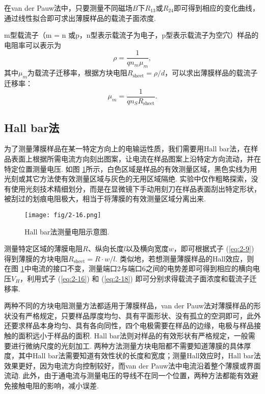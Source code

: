 \documentclass[12pt,a4paper,openany,twoside,UTF-8]{book}
\begin{document}
在van der Pauw法中，只要测量不同磁场$B$下$R_{13}$或$R_{24}$即可得到相应的变化曲线，通过线性拟合即可求出薄膜样品的载流子面浓度.

m型载流子（m = n 或p，n型表示载流子为电子，p型表示载流子为空穴）样品的电阻率可以表示为
\begin{equation}
\rho = \frac{1}{qn_m\mu_m},
\label{eq:2-17}
\end{equation}
其中$\mu_m$为载流子迁移率，根据方块电阻$R_{\mathrm{sheet}} = \rho/d$，可以求出薄膜样品的载流子迁移率：
\begin{equation}
\mu_m = \frac{1}{qn_SR_{\mathrm{sheet}}}.
\label{eq:2-18}
\end{equation}

\subsection{Hall bar法}
为了测量薄膜样品在某一特定方向上的电输运性质，我们需要用Hall bar法，在样品表面上根据所需电流方向刻出图案，让电流在样品图案上沿特定方向流动，并在特定位置测量电压. 如图 \ref{fig:2-16}所示，白色区域是样品的有效测量区域，黑色实线为用光刻或其它方法使有效测量区域与灰色的无用区域隔绝. 实验中仅作粗略探索，没有使用光刻技术精细划分，而是在显微镜下手动用刻刀在样品表面刮出特定形状，被刮过的划痕电阻极大，相当于将薄膜的有效测量区域分离出来.

\begin{figure}[htbp]
\centering
\texttt{[image: fig/2-16.png]}
\caption{Hall bar法测量电阻示意图.}
\label{fig:2-16} 
\end{figure}

测量特定区域的薄膜电阻$R$、纵向长度$l$以及横向宽度$w$，即可根据式子 (\ref{eq:2-9}) 得到薄膜的方块电阻$R_{\mathrm{sheet}} = R\cdot w/l$. 类似地，若想测量薄膜样品的Hall效应，则在图 \ref{fig:2-16}中电流的接口不变，测量端口2与端口6之间的电势差即可得到相应的横向电压$V_H$，利用式子 (\ref{eq:2-16}) 和 (\ref{eq:2-18}) 即可分别求得载流子面浓度和载流子迁移率.

两种不同的方块电阻测量方法都适用于薄膜样品，van der Pauw法对薄膜样品的形状没有严格规定，只要样品厚度均匀、具有平面形状、没有孤立的空洞即可，此外还要求样品本身均匀、具有各向同性，四个电极需要在样品的边缘，电极与样品接触的面积远小于样品的面积. Hall bar法则对样品的有效形状有严格规定，一般需要进行微纳尺度的光刻加工. 两种方法测量方块电阻都不需要知道薄膜的具体厚度，其中Hall bar法需要知道有效性状的长度和宽度；测量Hall效应时，Hall bar法效果更好，因为电流方向控制较好，而van der Pauw法中电流沿着整个薄膜或界面流动. 此外，由于通电流与测量电压的导线不在同一个位置，两种方法都能有效避免接触电阻的影响，减小误差.
\end{document}
